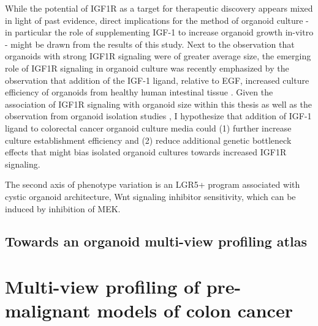 \begin{flushleft}
While the potential of IGF1R as a target for therapeutic discovery appears mixed in light of past evidence, direct implications for the method of organoid culture - in particular the role of supplementing IGF-1 to increase organoid growth in-vitro - might be drawn from the results of this study. Next to the observation that organoids with strong IGF1R signaling were of greater average size, the emerging role of IGF1R signaling in organoid culture was recently emphasized by the observation that addition of the IGF-1 ligand, relative to EGF, increased culture efficiency of organoids from healthy human intestinal tissue \cite{fujiiHumanIntestinalOrganoids2018a}. Given the association of IGF1R signaling with organoid size within this thesis as well as the observation from organoid isolation studies \cite{fujiiHumanIntestinalOrganoids2018a}, I hypothesize that addition of IGF-1 ligand to colorectal cancer organoid culture media could (1) further increase culture establishment efficiency and (2) reduce additional genetic bottleneck effects that might bias isolated organoid cultures towards increased IGF1R signaling.

\bigbreak

The second axis of phenotype variation is an LGR5+ program associated with cystic organoid architecture, Wnt signaling inhibitor sensitivity, which can be induced by inhibition of MEK.
\bigbreak

\subsection{Towards an organoid multi-view profiling atlas}


\section{Multi-view profiling of pre-malignant models of colon cancer}





\end{flushleft}